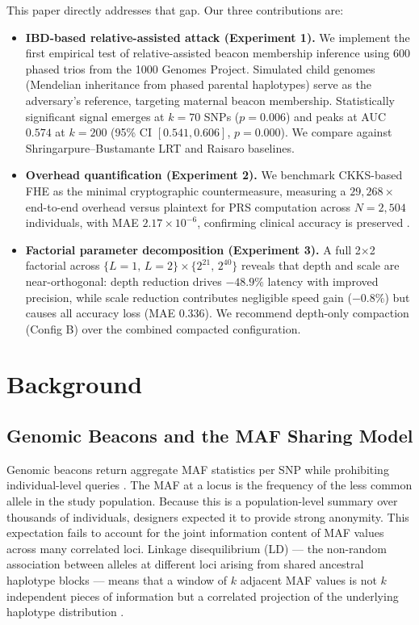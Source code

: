 \documentclass[conference]{IEEEtran}
\begin{document}
This paper directly addresses that gap. Our three contributions are:

\begin{itemize}
    \item \textbf{IBD-based relative-assisted attack (Experiment 1).} We
    implement the first empirical test of relative-assisted beacon membership
    inference using 600 phased trios from the 1000 Genomes Project. Simulated
    child genomes (Mendelian inheritance from phased parental haplotypes) serve
    as the adversary's reference, targeting maternal beacon membership.
    Statistically significant signal emerges at $k=70$ SNPs ($p=0.006$) and
    peaks at AUC $0.574$ at $k=200$ (95\% CI $[0.541, 0.606]$, $p=0.000$).
    We compare against Shringarpure--Bustamante LRT and Raisaro baselines.

    \item \textbf{Overhead quantification (Experiment 2).} We benchmark
    CKKS-based FHE as the minimal cryptographic countermeasure, measuring a
    $29{,}268\times$ end-to-end overhead versus plaintext for PRS computation
    across $N=2{,}504$ individuals, with MAE $2.17\times10^{-6}$, confirming
    clinical accuracy is preserved \cite{cheon2017,blatt2020}.

    \item \textbf{Factorial parameter decomposition (Experiment 3).} A full
    2$\times$2 factorial across $\{L=1,\,L=2\}\times\{2^{21},\,2^{40}\}$
    reveals that depth and scale are near-orthogonal: depth reduction drives
    $-48.9\%$ latency with improved precision, while scale reduction contributes
    negligible speed gain ($-0.8\%$) but causes all accuracy loss (MAE
    $0.336$). We recommend depth-only compaction (Config B) over the combined
    compacted configuration.
\end{itemize}

\section{Background}

\subsection{Genomic Beacons and the MAF Sharing Model}

Genomic beacons return aggregate MAF statistics per SNP while prohibiting
individual-level queries \cite{shringarpure2015}. The MAF at a locus is the
frequency of the less common allele in the study population. Because this is a
population-level summary over thousands of individuals, designers expected it
to provide strong anonymity. This expectation fails to account for the joint
information content of MAF values across many correlated loci. Linkage
disequilibrium (LD) --- the non-random association between alleles at different
loci arising from shared ancestral haplotype blocks --- means that a window of
$k$ adjacent MAF values is not $k$ independent pieces of information but a
correlated projection of the underlying haplotype distribution
\cite{im2012,gursoy2022beacon}.
\end{document}
